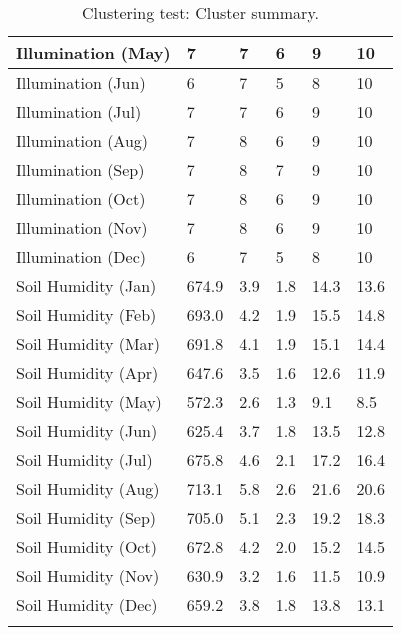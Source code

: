 \begin{longtable}{|p{4cm}|p{2cm}|p{2cm}|p{2cm}|p{2cm}|p{2cm}|}
		\hline
  	    Illumination (May) & 7 & 7 & 6 & 9 & 10 \\
		\hline
		Illumination (Jun) & 6 & 7 & 5 & 8 & 10 \\
		\hline
		Illumination (Jul) & 7 & 7 & 6 & 9 & 10 \\
		\hline
		Illumination (Aug) & 7 & 8 & 6 & 9 & 10 \\
		\hline
		Illumination (Sep) & 7 & 8 & 7 & 9 & 10 \\
		\hline
		Illumination (Oct) & 7 & 8 & 6 & 9 & 10 \\
		\hline
		Illumination (Nov) & 7 & 8 & 6 & 9 & 10 \\
		\hline
		Illumination (Dec) & 6 & 7 & 5 & 8 & 10 \\
		\hline
  	    Soil Humidity (Jan) & 674.9 & 3.9 & 1.8 & 14.3 & 13.6 \\
		\hline
  	    Soil Humidity (Feb) & 693.0 & 4.2 & 1.9 & 15.5 & 14.8 \\
		\hline
  	    Soil Humidity (Mar) & 691.8 & 4.1 & 1.9 & 15.1 & 14.4 \\
		\hline
  	    Soil Humidity (Apr) & 647.6 & 3.5 & 1.6 & 12.6 & 11.9 \\
		\hline
  	    Soil Humidity (May) & 572.3 & 2.6 & 1.3 & 9.1 & 8.5 \\
		\hline
  	    Soil Humidity (Jun) & 625.4 & 3.7 & 1.8 & 13.5 & 12.8 \\
		\hline
  	    Soil Humidity (Jul) & 675.8 & 4.6 & 2.1 & 17.2 & 16.4 \\
		\hline
  	    Soil Humidity (Aug) & 713.1 & 5.8 & 2.6 & 21.6 & 20.6 \\
		\hline
  	    Soil Humidity (Sep) & 705.0 & 5.1 & 2.3 & 19.2 & 18.3 \\
		\hline
  	    Soil Humidity (Oct) & 672.8 & 4.2 & 2.0 & 15.2 & 14.5 \\
		\hline
  	    Soil Humidity (Nov) & 630.9 & 3.2 & 1.6 & 11.5 & 10.9 \\
		\hline
  	    Soil Humidity (Dec) & 659.2 & 3.8 & 1.8 & 13.8 & 13.1\\
		\hline
		\caption{Clustering test: Cluster summary.}
	  \label{tab:clustering_test_resulting_clusters}
\end{longtable}